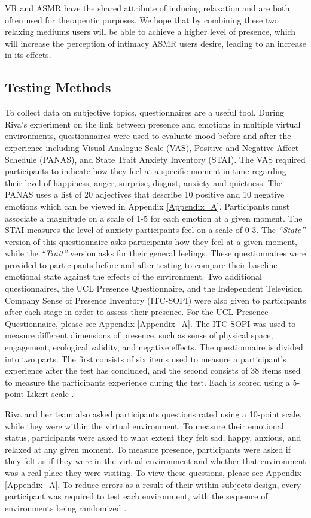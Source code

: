 \documentclass{sigchi}
\newcommand{\inlinequote}[1]{\textit{``#1''}}
\begin{document}
VR and ASMR have the shared attribute of inducing relaxation and are both often used for therapeutic purposes. We hope that by combining these two relaxing mediums users will be able to achieve a higher level of presence, which will increase the perception of intimacy ASMR users desire, leading to an increase in its effects.

\subsection{Testing Methods}
To collect data on subjective topics, questionnaires are a useful tool. During Riva's experiment on the link between presence and emotions in multiple virtual environments, questionnaires were used to evaluate mood before and after the experience including Visual Analogue Scale (VAS), Positive and Negative Affect Schedule (PANAS), and State Trait Anxiety Inventory (STAI). The VAS required participants to indicate how they feel at a specific moment in time regarding their level of happiness, anger, surprise, disgust, anxiety and quietness. The PANAS uses a list of 20 adjectives that describe 10 positive and 10 negative emotions which can be viewed in Appendix \ref{Appendix_A}. Participants must associate a magnitude on a scale of 1-5 for each emotion at a given moment. The STAI measures the level of anxiety participants feel on a scale of 0-3. The \inlinequote{State} version of this questionnaire asks participants how they feel at a given moment, while the \inlinequote{Trait} version asks for their general feelings. These questionnaires were provided to participants before and after testing to compare their baseline emotional state against the effects of the environment. Two additional questionnaires, the UCL Presence Questionnaire, and the Independent Television Company Sense of Presence Inventory (ITC-SOPI) were also given to participants after each stage in order to assess their presence. For the UCL Presence Questionnaire, please see Appendix \ref{Appendix_A}.
The ITC-SOPI was used to measure different dimensions of presence, such as sense of physical space, engagement, ecological validity, and negative effects. The questionnaire is divided into two parts. The first consists of six items used to measure a participant's experience after the test has concluded, and the second consists of 38 items used to measure the participants experience during the test. Each is scored using a 5-point Likert scale \cite{riva2007affective}.

Riva and her team also asked participants questions rated using a 10-point scale, while they were within the virtual environment. To measure their emotional status, participants were asked to what extent they felt sad, happy, anxious, and relaxed at any given moment. To measure presence, participants were asked if they felt as if they were in the virtual environment and whether that environment was a real place they were visiting. To view these questions, please see Appendix \ref{Appendix_A}.
To reduce errors as a result of their within-subjects design, every participant was required to test each environment, with the sequence of environments being randomized \cite{riva2007affective}.
\end{document}
